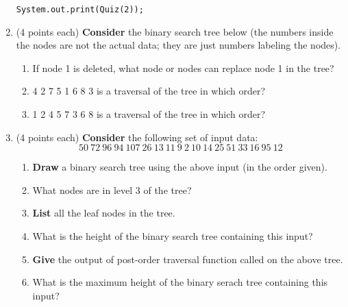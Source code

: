 \documentclass[12pt, a4paper]{article}
\begin{document}
\begin{enumerate}
    \verb|System.out.print(Quiz(2));|



    \newpage



    \item (4 points each) \textbf{Consider} the binary search tree below
        (the numbers inside the nodes are not the actual data; they are just numbers labeling the nodes).
    \begin{enumerate}

        \item If node 1 is deleted, what node or nodes can replace node 1 in the tree?
        
        \item 4 2 7 5 1 6 8 3 is a traversal of the tree in which order?
        
        \item 1 2 4 5 7 3 6 8 is a traversal of the tree in which order?
    
    \end{enumerate}



    \newpage



    \item (4 points each) \textbf{Consider} the following set of input data:
    \begin{equation*}
        50\ 72\ 96\ 94\ 107\ 26\ 13\ 11\ 9\ 2\ 10\ 14\ 25\ 51\ 33\ 16\ 95\ 12
    \end{equation*}
    
    \begin{enumerate}

        \item \textbf{Draw} a binary search tree using the above input (in the order given).
    
        \item What nodes are in level 3 of the tree?
        
        \item \textbf{List} all the leaf nodes in the tree.
        
        \item What is the height of the binary search tree containing this input?
        
        \item \textbf{Give} the output of post-order traversal function called on the above tree.
        
        \item What is the maximum height of the binary serach tree containing this input?
        

\end{enumerate}
\end{enumerate}
\end{document}
